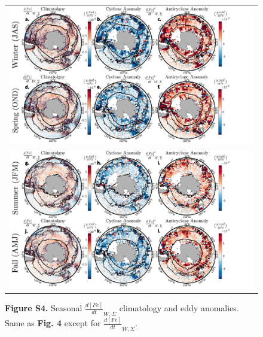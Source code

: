 \documentclass{article}
\begin{document}
\begin{figure}[!htbp]
 \begin{adjustwidth}{-1.2in}{-1.2in}
 \centering
  \begin{tabular}{c }
        \includegraphics[scale=.5]{FigS2a.pdf} \\
        \includegraphics[scale=.5]{FigS2b.pdf} \\
  \end{tabular}
 \end{adjustwidth}
\caption[S4. Seasonal $\frac{d[Fe]}{dt}_{W, \Sigma}$ climatology and eddy anomalies. ]
{\textbf{Figure S4.} Seasonal $\frac{d[Fe]}{dt}_{W, \Sigma}$ climatology and eddy anomalies. Same as \textbf{Fig. 4} except for $\frac{d[Fe]}{dt}_{W, \Sigma}$.
}
\label{fig:FigS4}
\end{figure}

\end{document}
